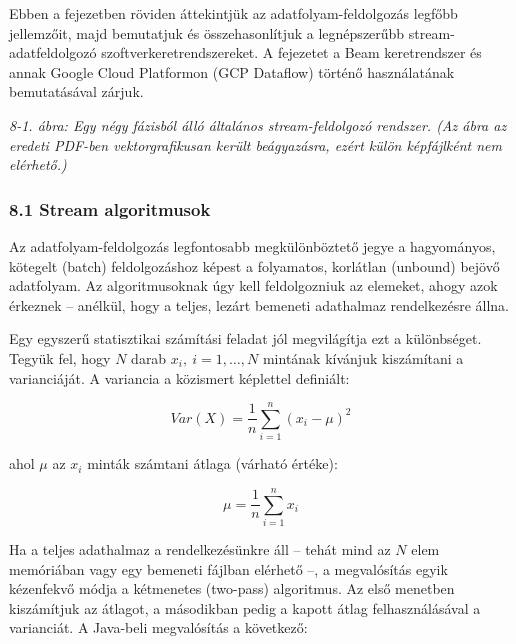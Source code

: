 \documentclass[
]{article}
\begin{document}
Ebben a fejezetben röviden áttekintjük az adatfolyam-feldolgozás legfőbb
jellemzőit, majd bemutatjuk és összehasonlítjuk a legnépszerűbb
stream-adatfeldolgozó szoftverkeretrendszereket. A fejezetet a Beam
keretrendszer és annak Google Cloud Platformon (GCP Dataflow) történő
használatának bemutatásával zárjuk.

\emph{8-1. ábra: Egy négy fázisból álló általános stream-feldolgozó
rendszer. (Az ábra az eredeti PDF-ben vektorgrafikusan került
beágyazásra, ezért külön képfájlként nem elérhető.)}

\hypertarget{stream-algoritmusok}{%
\subsubsection{8.1 Stream algoritmusok}\label{stream-algoritmusok}}

Az adatfolyam-feldolgozás legfontosabb megkülönböztető jegye a
hagyományos, kötegelt (batch) feldolgozáshoz képest a folyamatos,
korlátlan (unbound) bejövő adatfolyam. Az algoritmusoknak úgy kell
feldolgozniuk az elemeket, ahogy azok érkeznek -- anélkül, hogy a
teljes, lezárt bemeneti adathalmaz rendelkezésre állna.

Egy egyszerű statisztikai számítási feladat jól megvilágítja ezt a
különbséget. Tegyük fel, hogy \(N\) darab \(x_i,\ i = 1, \ldots, N\)
mintának kívánjuk kiszámítani a varianciáját. A variancia a közismert
képlettel definiált:

\[Var(X) = \frac{1}{n}\sum_{i=1}^{n} (x_i - \mu)^2\]

ahol \(\mu\) az \(x_i\) minták számtani átlaga (várható értéke):

\[\mu = \frac{1}{n}\sum_{i=1}^{n} x_i\]

Ha a teljes adathalmaz a rendelkezésünkre áll -- tehát mind az \(N\)
elem memóriában vagy egy bemeneti fájlban elérhető --, a megvalósítás
egyik kézenfekvő módja a kétmenetes (two-pass) algoritmus. Az első
menetben kiszámítjuk az átlagot, a másodikban pedig a kapott átlag
felhasználásával a varianciát. A Java-beli megvalósítás a következő:
\end{document}
